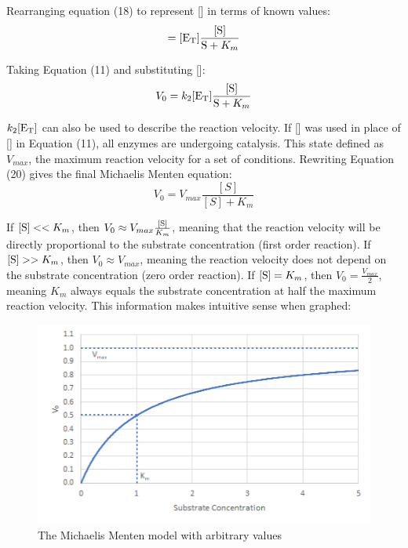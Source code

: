 \documentclass{article}
\begin{document}
Rearranging equation (18) to represent [] in terms of known values:
\begin{equation}
    [\ce{ES}] = [\ce{E_T}]\frac{[\ce{S}]}{\ce{S} + K_m}
\end{equation}

Taking Equation (11) and substituting []:
\begin{equation}
    V_0 = k_2[\ce{E_T}]\frac{[\ce{S}]}{\ce{S} + K_m}
\end{equation}

$k_2[\ce{E_T}]$ can also be used to describe the reaction velocity. If [] was used in place of [] in Equation (11), all enzymes are undergoing catalysis. This state defined as $V_{max}$, the maximum reaction velocity for a set of conditions. Rewriting Equation (20) gives the final Michaelis Menten equation:
\begin{equation}
    V_0 = V_{max}\frac{[S]}{[S] + K_m}
\end{equation}

If $[\ce{S}] << K_m$, then $V_0 \approx V_{max}\frac{[\ce{S}]}{K_m}$, meaning that the reaction velocity will be directly proportional to the substrate concentration (first order reaction). If $[\ce{S}] >> K_m$, then $V_0 \approx V_{max}$, meaning the reaction velocity does not depend on the substrate concentration (zero order reaction). If $[\ce{S}] = K_m$, then $V_0 = \frac{V_{max}}{2}$, meaning $K_m$ always equals the substrate concentration at half the maximum reaction velocity. This information makes intuitive sense when graphed:
\begin{figure}[H]
    \renewcommand{\figurename}{Graph}
    \setcounter{figure}{0}
    \centering
    \includegraphics{figures/graph_01.png}
    \vspace*{-12pt}
    \caption{The Michaelis Menten model with arbitrary values}
    \label{fig:graph1}
\end{figure}
\end{document}
